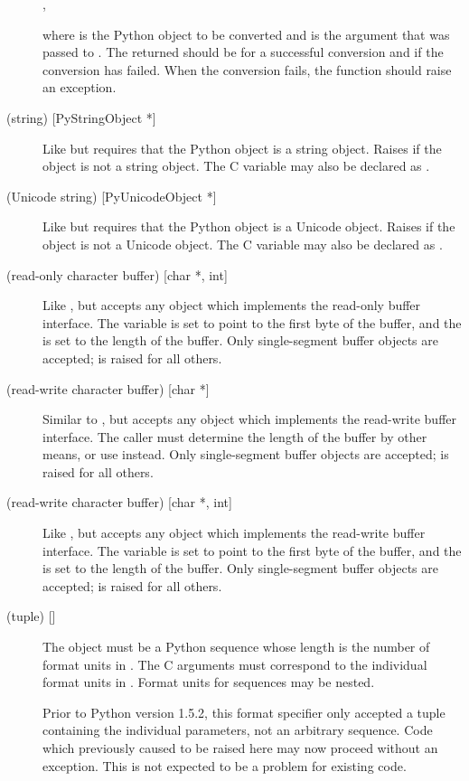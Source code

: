 \documentclass{manual}
\begin{document}
\begin{description}
\code{ = }\code{(}, \code{);}

where  is the Python object to be converted and
 is the  argument that was passed to
.  The returned  should be
 for a successful conversion and  if the conversion
has failed.  When the conversion fails, the  function
should raise an exception.

\item[\samp{S} (string) {[PyStringObject *]}]
Like  but requires that the Python object is a string object.
Raises  if the object is not a string object.
The C variable may also be declared as .

\item[\samp{U} (Unicode string) {[PyUnicodeObject *]}]
Like  but requires that the Python object is a Unicode object.
Raises  if the object is not a Unicode object.
The C variable may also be declared as .

\item[\samp{t\#} (read-only character buffer) {[char *, int]}]
Like , but accepts any object which implements the read-only 
buffer interface.  The  variable is set to point to the
first byte of the buffer, and the  is set to the length of
the buffer.  Only single-segment buffer objects are accepted;
 is raised for all others.

\item[\samp{w} (read-write character buffer) {[char *]}]
Similar to , but accepts any object which implements the
read-write buffer interface.  The caller must determine the length of
the buffer by other means, or use  instead.  Only
single-segment buffer objects are accepted;  is
raised for all others.

\item[\samp{w\#} (read-write character buffer) {[char *, int]}]
Like , but accepts any object which implements the
read-write buffer interface.  The  variable is set to
point to the first byte of the buffer, and the  is set to
the length of the buffer.  Only single-segment buffer objects are
accepted;  is raised for all others.

\item[\samp{(\var{items})} (tuple) {[\var{matching-items}]}]
The object must be a Python sequence whose length is the number of
format units in .  The C arguments must correspond to the
individual format units in .  Format units for sequences
may be nested.

 Prior to Python version 1.5.2, this format specifier
only accepted a tuple containing the individual parameters, not an
arbitrary sequence.  Code which previously caused
 to be raised here may now proceed without an
exception.  This is not expected to be a problem for existing code.

\end{description}
\end{document}
